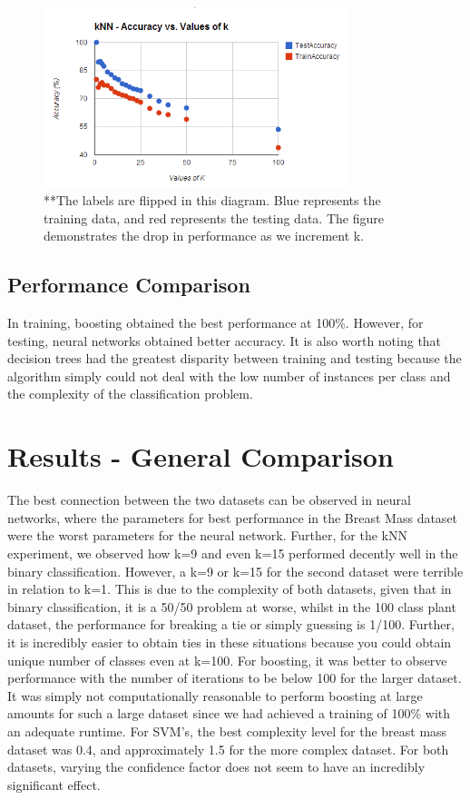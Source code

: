 \documentclass[annual]{acmsiggraph}
\begin{document}
\begin{figure}[ht]
  \centering
  \includegraphics[width=3.5in]{charts/chart_1_knn_d2.PNG}
  \caption{**The labels are flipped in this diagram. Blue represents the training data,
  and red represents the testing data. The figure demonstrates the drop in performance as we increment k.}
  \label{fig:knn1d2}
\end{figure}

\subsection{Performance Comparison}

In training, boosting obtained the best performance at 100\%. However, for testing,
neural networks obtained better accuracy. It is also worth noting that decision
trees had the greatest disparity between training and testing because the algorithm
simply could not deal with the low number of instances per class and the complexity
of the classification problem.

\section{Results - General Comparison}
The best connection between the two datasets can be observed in neural networks,
where the parameters for best performance in the Breast Mass dataset were the
worst parameters for the neural network. Further, for the kNN experiment, we 
observed how k=9 and even k=15 performed decently well in the binary classification.
However, a k=9 or k=15 for the second dataset were terrible in relation to k=1. 
This is due to the complexity of both datasets, given that in binary classification,
it is a 50/50 problem at worse, whilst in the 100 class plant dataset, the performance
for breaking a tie or simply guessing is 1/100. Further, it is incredibly easier
to obtain ties in these situations because you could obtain unique number of classes
even at k=100. For boosting, it was better to observe performance with the number
of iterations to be below 100 for the larger dataset. It was simply not computationally
reasonable to perform boosting at large amounts for such a large dataset since we
had achieved a training of 100\% with an adequate runtime. For SVM's, the best complexity
level for the breast mass dataset was 0.4, and approximately 1.5 for the more complex
dataset. For both datasets, varying the confidence factor does not seem to have
an incredibly significant effect. 
\end{document}
